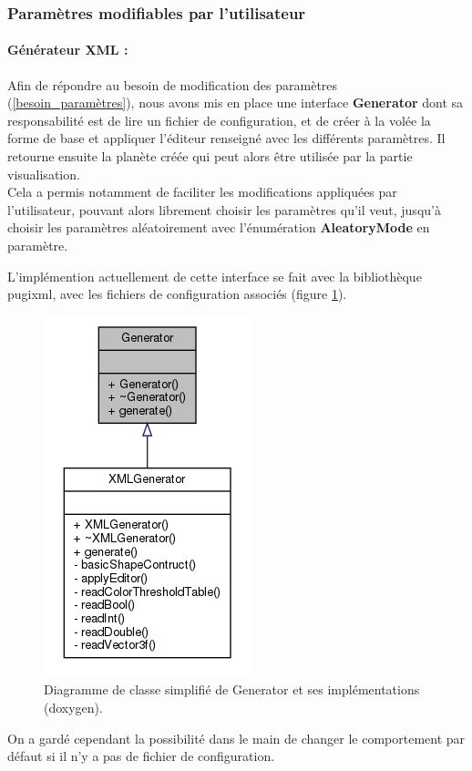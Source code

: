 \documentclass[a4paper]{article}
\begin{document}
\subsubsection{Paramètres modifiables par l'utilisateur}

\paragraph{Générateur XML :}

Afin de répondre au besoin de modification des paramètres (\ref{besoin_paramètres}), nous avons mis en place une interface \textbf{Generator} dont sa responsabilité est de lire un fichier de configuration, et de créer à la volée la forme de base et appliquer l'éditeur renseigné avec les différents paramètres.
Il retourne ensuite la planète créée qui peut alors être utilisée par la partie visualisation.\\
Cela a permis notamment de faciliter les modifications appliquées par l'utilisateur, pouvant alors librement choisir les paramètres qu'il veut, jusqu'à choisir les paramètres aléatoirement avec l'énumération \textbf{AleatoryMode} en paramètre.

L'implémention actuellement de cette interface se fait avec la bibliothèque pugixml, avec les fichiers de configuration associés (figure \ref{archi_generator}).
    \begin{figure}[!ht]
        \begin{center} \includegraphics[width=0.3\linewidth]{img/archi/archi_generator.png}\end{center}
        \caption{\label{archi_generator}Diagramme de classe simplifié de Generator et ses implémentations (doxygen).}
    \end{figure}
    
On a gardé cependant la possibilité dans le main de changer le comportement par défaut si il n'y a pas de fichier de configuration.
\end{document}
